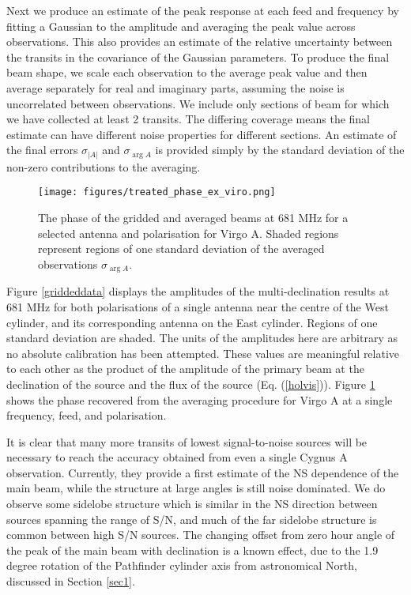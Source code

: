 Next we produce an estimate of the peak response at each feed and frequency by fitting a Gaussian to the amplitude and averaging the peak value across observations. This also provides an estimate of the relative uncertainty between the transits in the covariance of the Gaussian parameters. To produce the final beam shape, we scale each observation to the average peak value and then average separately for real and imaginary parts, assuming the noise is uncorrelated between observations. We include only sections of beam for which we have collected at least 2 transits. The differing coverage means the final estimate can have different noise properties for different sections. An estimate of the final errors $\sigma_{|A|}$ and $\sigma_{\arg{A}}$ is provided simply by the standard deviation of the non-zero contributions to the averaging.

\begin{figure}[h!] %
	\centering
	\texttt{[image: figures/treated\_phase\_ex\_viro.png]}%
	\caption{The phase of the gridded and averaged beams at 681 MHz for a selected antenna and polarisation for Virgo A. Shaded regions represent regions of one standard deviation of the averaged observations $\sigma_{\arg{A}}$.}
	\label{phaseav}
\end{figure} 

Figure \ref{griddeddata} displays the amplitudes of the multi-declination results at 681 MHz for both polarisations of a single antenna near the centre of the West cylinder, and its corresponding antenna on the East cylinder. Regions of one standard deviation are shaded. The units of the amplitudes here are arbitrary as no absolute calibration has been attempted. These values are meaningful relative to each other as the product of the amplitude of the primary beam at the declination of the source and the flux of the source (Eq. (\ref{holvis})). Figure \ref{phaseav} shows the phase recovered from the averaging procedure for Virgo A at a single frequency, feed, and polarisation.

It is clear that many more transits of lowest signal-to-noise sources will be necessary to reach the accuracy obtained from even a single Cygnus A observation. Currently, they provide a first estimate of the NS dependence of the main beam, while the structure at large angles is still noise dominated. We do observe some sidelobe structure which is similar in the NS direction between sources spanning the range of S/N, and much of the far sidelobe structure is common between high S/N sources. The changing offset from zero hour angle of the peak of the main beam with declination is a known effect, due to the 1.9 degree rotation of the Pathfinder cylinder axis from astronomical North, discussed in Section \ref{sec1}. 

